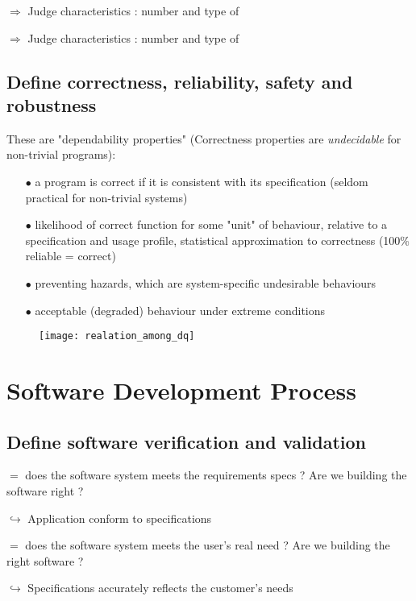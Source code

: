 \begin{minipage}[t]{0.48\textwidth}
    $\Rightarrow$ Judge  characteristics : number and type of 
\end{minipage}
\hfill
\begin{minipage}[t]{0.48\textwidth}
    $\Rightarrow$ Judge  characteristics : number and type of 
\end{minipage}

\newpage
\section{Define correctness, reliability, safety and robustness}

These are "dependability properties" (Correctness properties are \textit{undecidable} for non-trivial programs): 
\begin{itemize}
    \item [$\bullet$] a program is correct if it is consistent with its specification (seldom practical for non-trivial systems)
    \item [$\bullet$] likelihood of correct function for some "unit" of behaviour, relative to a specification and usage profile, statistical approximation to correctness (100\% reliable = correct)
    \item [$\bullet$] preventing hazards, which are system-specific undesirable behaviours
    \item [$\bullet$] acceptable (degraded) behaviour under extreme conditions
\end{itemize}

\begin{figure}[H]
    \centering
    \texttt{[image: realation\_among\_dq]}
\end{figure}

\chapter{Software Development Process}

\section{Define software verification and validation}

\begin{minipage}[t]{0.48\textwidth}
     $=$ does the software system meets the requirements specs ? Are we building the software right ?
    
    $\hookrightarrow$ Application conform to specifications
\end{minipage}
\hfill
\begin{minipage}[t]{0.48\textwidth}
     $=$ does the software system meets the user's real need ? Are we building the right software ?
    
    $\hookrightarrow$ Specifications accurately reflects the customer's needs
\end{minipage}

